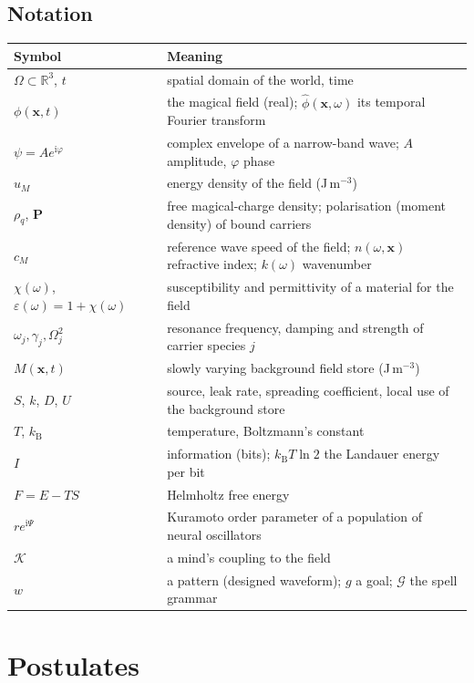 \documentclass[11pt,a4paper]{article}
\numberwithin{equation}{section}
\theoremstyle{definition}
\theoremstyle{plain}
\theoremstyle{remark}
\newcommand{\kB}{k_{\mathrm B}}
\newcommand{\cM}{c_{M}}
\newcommand{\ii}{\mathrm i}
\newcommand{\R}{\mathbb R}
\begin{document}
\subsection{Notation}
\begin{center}\small
\begin{tabularx}{\textwidth}{@{}lX@{}}
\toprule
Symbol & Meaning\\
\midrule
$\Omega\subset\R^3$, $t$ & spatial domain of the world, time\\
$\phi(\bm x,t)$ & the magical field (real); $\hat\phi(\bm x,\omega)$ its temporal Fourier transform\\
$\psi = A e^{\ii\varphi}$ & complex envelope of a narrow-band wave; $A$ amplitude, $\varphi$ phase\\
$u_M$ & energy density of the field (J\,m$^{-3}$)\\
$\rho_q$, $\bm P$ & free magical-charge density; polarisation (moment density) of bound carriers\\
$\cM$ & reference wave speed of the field; $n(\omega,\bm x)$ refractive index; $k(\omega)$ wavenumber\\
$\chi(\omega)$, $\varepsilon(\omega)=1+\chi(\omega)$ & susceptibility and permittivity of a material for the field\\
$\omega_j,\gamma_j,\Omega_j^2$ & resonance frequency, damping and strength of carrier species $j$\\
$M(\bm x,t)$ & slowly varying background field store (J\,m$^{-3}$)\\
$S$, $k$, $D$, $U$ & source, leak rate, spreading coefficient, local use of the background store\\
$T$, $\kB$ & temperature, Boltzmann's constant\\
$I$ & information (bits); $\kB T\ln 2$ the Landauer energy per bit\\
$F=E-TS$ & Helmholtz free energy\\
$r e^{\ii\Psi}$ & Kuramoto order parameter of a population of neural oscillators\\
$\mathcal K$ & a mind's coupling to the field\\
$w$ & a pattern (designed waveform); $g$ a goal; $\mathcal G$ the spell grammar\\
\bottomrule
\end{tabularx}
\end{center}

\section{Postulates}
\end{document}
